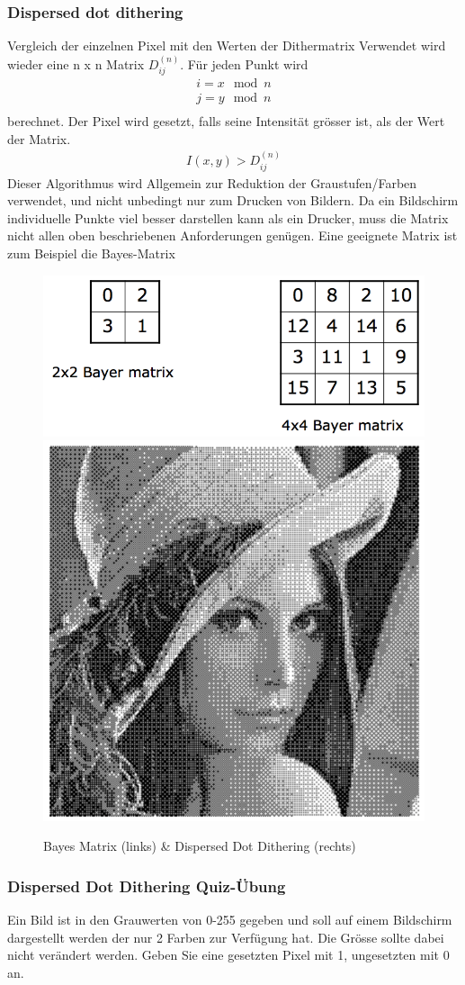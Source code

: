 \subsubsection{Dispersed dot dithering} 
Vergleich der einzelnen Pixel mit den Werten der Dithermatrix
Verwendet wird wieder eine n x n Matrix \(D_{ij}^{(n)}\). Für jeden Punkt wird
\begin{gather*}
i = x \mod n\\
j = y \mod n\\
\end{gather*}                                           
berechnet. Der Pixel wird gesetzt, falls seine Intensität grösser ist, als der Wert der Matrix.
\begin{gather*}
I(x,y) > D_{ij}^{(n)}   
\end{gather*}
Dieser Algorithmus wird Allgemein zur Reduktion der Graustufen/Farben verwendet, und nicht unbedingt nur zum Drucken von Bildern. Da ein Bildschirm individuelle Punkte viel besser darstellen kann als ein Drucker, muss die Matrix nicht allen oben beschriebenen Anforderungen genügen. Eine geeignete Matrix ist zum Beispiel die Bayes-Matrix
\begin{figure}[!ht]
\centering
\includegraphics[width=0.5\linewidth]{fig/bayesmatrix}
\includegraphics[width=0.3\linewidth]{fig/disperseddot}
\caption{Bayes Matrix (links) \& Dispersed Dot Dithering (rechts)}
\label{fig:bayesmatrix}
\end{figure}


\subsubsection{Dispersed Dot Dithering Quiz-Übung}
Ein Bild ist in den Grauwerten von 0-255 gegeben und soll auf einem Bildschirm dargestellt werden der nur 2 Farben zur Verfügung hat. Die Grösse sollte dabei nicht verändert werden. Geben Sie eine gesetzten Pixel mit 1, ungesetzten mit 0 an.

